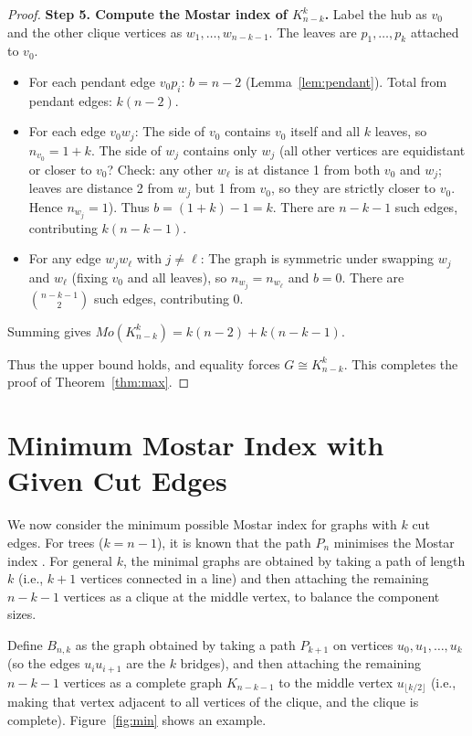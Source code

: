 \documentclass[12pt,a4paper]{article}
\theoremstyle{definition}
\begin{document}
\begin{proof}
\textbf{Step 5. Compute the Mostar index of \(K_{n-k}^k\).} Label the hub as \(v_0\) and the other clique vertices as \(w_1,\dots,w_{n-k-1}\). The leaves are \(p_1,\dots,p_k\) attached to \(v_0\). 
\begin{itemize}
\item For each pendant edge \(v_0p_i\): \(b = n-2\) (Lemma~\ref{lem:pendant}). Total from pendant edges: \(k(n-2)\).
\item For each edge \(v_0w_j\): The side of \(v_0\) contains \(v_0\) itself and all \(k\) leaves, so \(n_{v_0}=1+k\). The side of \(w_j\) contains only \(w_j\) (all other vertices are equidistant or closer to \(v_0\)? Check: any other \(w_\ell\) is at distance 1 from both \(v_0\) and \(w_j\); leaves are distance 2 from \(w_j\) but 1 from \(v_0\), so they are strictly closer to \(v_0\). Hence \(n_{w_j}=1\)). Thus \(b = (1+k)-1 = k\). There are \(n-k-1\) such edges, contributing \(k(n-k-1)\).
\item For any edge \(w_j w_\ell\) with \(j\neq\ell\): The graph is symmetric under swapping \(w_j\) and \(w_\ell\) (fixing \(v_0\) and all leaves), so \(n_{w_j}=n_{w_\ell}\) and \(b=0\). There are \(\binom{n-k-1}{2}\) such edges, contributing 0.
\end{itemize}
Summing gives \(Mo(K_{n-k}^k)=k(n-2)+k(n-k-1)\).

Thus the upper bound holds, and equality forces \(G\cong K_{n-k}^k\). This completes the proof of Theorem~\ref{thm:max}.
\end{proof}

\section{Minimum Mostar Index with Given Cut Edges}\label{sec:min}

We now consider the minimum possible Mostar index for graphs with \(k\) cut edges. For trees (\(k=n-1\)), it is known that the path \(P_n\) minimises the Mostar index \cite{Doslic2018}. For general \(k\), the minimal graphs are obtained by taking a path of length \(k\) (i.e., \(k+1\) vertices connected in a line) and then attaching the remaining \(n-k-1\) vertices as a clique at the middle vertex, to balance the component sizes.

Define \(B_{n,k}\) as the graph obtained by taking a path \(P_{k+1}\) on vertices \(u_0,u_1,\dots,u_k\) (so the edges \(u_iu_{i+1}\) are the \(k\) bridges), and then attaching the remaining \(n-k-1\) vertices as a complete graph \(K_{n-k-1}\) to the middle vertex \(u_{\lfloor k/2\rfloor}\) (i.e., making that vertex adjacent to all vertices of the clique, and the clique is complete). Figure~\ref{fig:min} shows an example.
\end{document}
